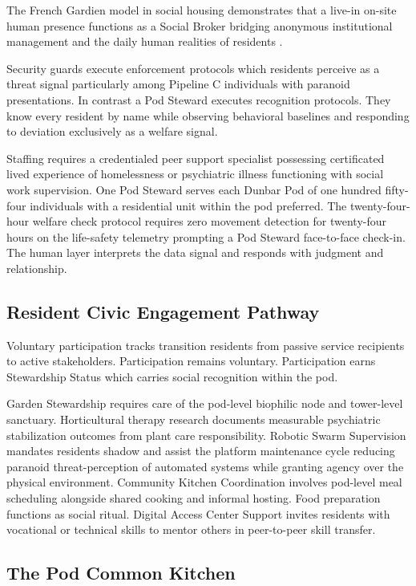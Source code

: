 \documentclass[12pt, letterpaper]{article}
\begin{document}
The French Gardien model in social housing demonstrates that a live-in on-site human presence functions as a Social Broker bridging anonymous institutional management and the daily human realities of residents \citep{harvard_gsd_gardien, tu_eindhoven_2024}.

Security guards execute enforcement protocols which residents perceive as a threat signal particularly among Pipeline C individuals with paranoid presentations. In contrast a Pod Steward executes recognition protocols. They know every resident by name while observing behavioral baselines and responding to deviation exclusively as a welfare signal.

Staffing requires a credentialed peer support specialist possessing certificated lived experience of homelessness or psychiatric illness functioning with social work supervision. One Pod Steward serves each Dunbar Pod of one hundred fifty-four individuals with a residential unit within the pod preferred. The twenty-four-hour welfare check protocol requires zero movement detection for twenty-four hours on the life-safety telemetry prompting a Pod Steward face-to-face check-in. The human layer interprets the data signal and responds with judgment and relationship.

\subsection{Resident Civic Engagement Pathway}

Voluntary participation tracks transition residents from passive service recipients to active stakeholders. Participation remains voluntary. Participation earns Stewardship Status which carries social recognition within the pod.

Garden Stewardship requires care of the pod-level biophilic node and tower-level sanctuary. Horticultural therapy research documents measurable psychiatric stabilization outcomes from plant care responsibility. Robotic Swarm Supervision mandates residents shadow and assist the platform maintenance cycle reducing paranoid threat-perception of automated systems while granting agency over the physical environment. Community Kitchen Coordination involves pod-level meal scheduling alongside shared cooking and informal hosting. Food preparation functions as social ritual. Digital Access Center Support invites residents with vocational or technical skills to mentor others in peer-to-peer skill transfer.

\subsection{The Pod Common Kitchen}
\end{document}
